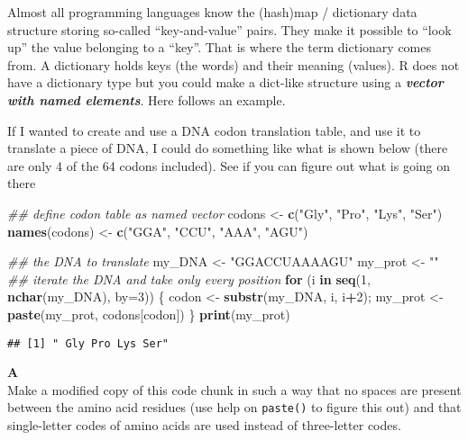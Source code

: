 \documentclass[]{book}
\newenvironment{Shaded}{\begin{snugshade}}{\end{snugshade}}
\newcommand{\CommentTok}[1]{\textcolor[rgb]{0.56,0.35,0.01}{\textit{#1}}}
\newcommand{\ControlFlowTok}[1]{\textcolor[rgb]{0.13,0.29,0.53}{\textbf{#1}}}
\newcommand{\DataTypeTok}[1]{\textcolor[rgb]{0.13,0.29,0.53}{#1}}
\newcommand{\DecValTok}[1]{\textcolor[rgb]{0.00,0.00,0.81}{#1}}
\newcommand{\KeywordTok}[1]{\textcolor[rgb]{0.13,0.29,0.53}{\textbf{#1}}}
\newcommand{\NormalTok}[1]{#1}
\newcommand{\OperatorTok}[1]{\textcolor[rgb]{0.81,0.36,0.00}{\textbf{#1}}}
\newcommand{\StringTok}[1]{\textcolor[rgb]{0.31,0.60,0.02}{#1}}
\begin{document}
Almost all programming languages know the (hash)map / dictionary data structure storing so-called ``key-and-value'' pairs. They make it possible to ``look up'' the value belonging to a ``key''. That is where the term dictionary comes from. A dictionary holds keys (the words) and their meaning (values). R does not have a dictionary type but you could make a dict-like structure using a \textbf{\emph{vector with named elements}}. Here follows an example.

If I wanted to create and use a DNA codon translation table, and use it to translate a piece of DNA, I could do something like what is shown below (there are only 4 of the 64 codons included). See if you can figure out what is going on there

\begin{Shaded}
\begin{Highlighting}[]
\CommentTok{## define codon table as named vector}
\NormalTok{codons <-}\StringTok{ }\KeywordTok{c}\NormalTok{(}\StringTok{"Gly"}\NormalTok{, }\StringTok{"Pro"}\NormalTok{, }\StringTok{"Lys"}\NormalTok{, }\StringTok{"Ser"}\NormalTok{)}
\KeywordTok{names}\NormalTok{(codons) <-}\StringTok{ }\KeywordTok{c}\NormalTok{(}\StringTok{"GGA"}\NormalTok{, }\StringTok{"CCU"}\NormalTok{, }\StringTok{"AAA"}\NormalTok{, }\StringTok{"AGU"}\NormalTok{)}

\CommentTok{## the DNA to translate}
\NormalTok{my_DNA <-}\StringTok{ "GGACCUAAAAGU"}
\NormalTok{my_prot <-}\StringTok{ ""}
\CommentTok{## iterate the DNA and take only every position}
\ControlFlowTok{for}\NormalTok{ (i }\ControlFlowTok{in} \KeywordTok{seq}\NormalTok{(}\DecValTok{1}\NormalTok{, }\KeywordTok{nchar}\NormalTok{(my_DNA), }\DataTypeTok{by=}\DecValTok{3}\NormalTok{)) \{}
\NormalTok{    codon <-}\StringTok{ }\KeywordTok{substr}\NormalTok{(my_DNA, i, i}\OperatorTok{+}\DecValTok{2}\NormalTok{);}
\NormalTok{    my_prot <-}\StringTok{ }\KeywordTok{paste}\NormalTok{(my_prot, codons[codon])}
\NormalTok{\}}
\KeywordTok{print}\NormalTok{(my_prot)}
\end{Highlighting}
\end{Shaded}

\begin{verbatim}
## [1] " Gly Pro Lys Ser"
\end{verbatim}

\textbf{A}\\
Make a modified copy of this code chunk in such a way that no spaces are present between the amino acid residues (use help on \texttt{paste()} to figure this out) and that single-letter codes of amino acids are used instead of three-letter codes.
\end{document}
